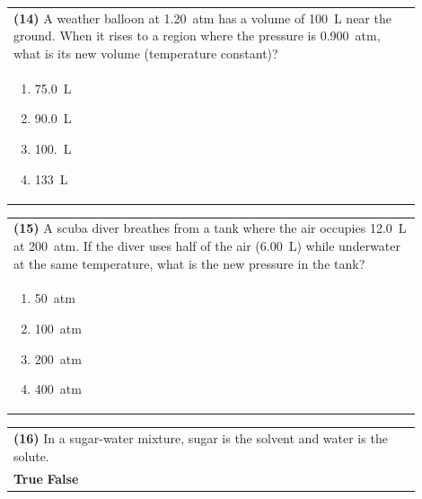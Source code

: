 \documentclass{article}
\begin{document}
{{\vspace{0.2cm}
\noindent\begin{tabular}{|p{0.9\linewidth}|}
\hline
\textbf{(14)} A weather balloon at 1.20~atm has a volume of 100~L near the ground. When it rises to a region where the pressure is 0.900~atm, what is its new volume (temperature constant)?\\[0.2cm]
\begin{minipage}[t]{0.85\linewidth}
\begin{enumerate}[label=\alph*.]
\item 75.0~L
\item 90.0~L
\item 100.~L
\item 133~L
\end{enumerate}
\end{minipage}\\[0.2cm]
\hline
\end{tabular}

\vspace{0.2cm}
\noindent\begin{tabular}{|p{0.9\linewidth}|}
\hline
\textbf{(15)} A scuba diver breathes from a tank where the air occupies 12.0~L at 200~atm. If the diver uses half of the air (6.00~L) while underwater at the same temperature, what is the new pressure in the tank?\\[0.2cm]
\begin{minipage}[t]{0.85\linewidth}
\begin{enumerate}[label=\alph*.]
\item 50~atm
\item 100~atm
\item 200~atm
\item 400~atm
\end{enumerate}
\end{minipage}\\[0.2cm]
\hline
\end{tabular}

\vspace{0.2cm}
\noindent\begin{tabular}{|p{0.9\linewidth}|}
\hline
\textbf{(16)} In a sugar-water mixture, sugar is the solvent and water is the solute.\\[0.2cm]
\textbf{True} \hspace{1cm} \textbf{False}\\[0.2cm]
\hline
\end{tabular}
\newpage

}}
\end{document}
